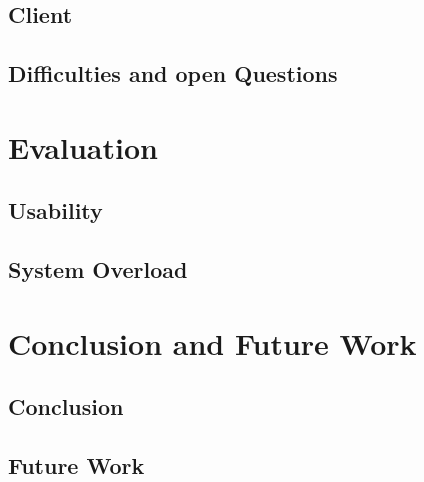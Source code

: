 \documentclass[english, BCOR=6mm, twoside=true, open=right]{tudscrreprt}
\begin{document}
\section{Client}
\section{Difficulties and open Questions}


\chapter{Evaluation}
\section{Usability}
\section{System Overload}


\chapter{Conclusion and Future Work}
\section{Conclusion}
\section{Future Work}


\newpage
{}
\listoffigures

\newpage
{}
\listoftables

\newpage
{}
\printglossary

\newpage
{}


\end{document}

